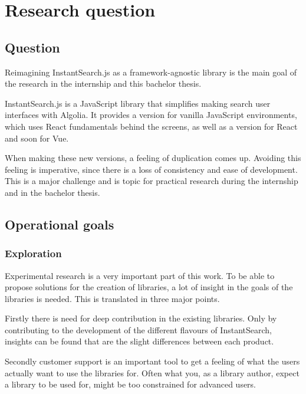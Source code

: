 
\chapter{Research question} %
\label{chp:research_question}
\section{Question}
\label{sec:question}

Reimagining InstantSearch.js as a framework-agnostic \gls{library} is the main goal of the research in the internship and this bachelor thesis.

InstantSearch.js is a JavaScript \gls{library} that simplifies making search user interfaces with Algolia. It provides a version for vanilla JavaScript environments, which uses React fundamentals behind the screens, as well as a version for React and soon for Vue.

When making these new versions, a feeling of duplication comes up. Avoiding this feeling is imperative, since there is a loss of consistency and ease of development. This is a major challenge and is topic for practical research during the internship and in the bachelor thesis.

\section{Operational goals}
\label{sec:operational_goals}

\subsection{Exploration}

Experimental research is a very important part of this work. To be able to propose solutions for the creation of libraries, a lot of insight in the goals of the libraries is needed. This is translated in three major points. 

Firstly there is need for deep contribution in the existing libraries. Only by contributing to the development of the different flavours of InstantSearch, insights can be found that are the slight differences between each product.

Secondly customer support is an important tool to get a feeling of what the users actually want to use the libraries for. Often what you, as a \gls{library} author, expect a \gls{library} to be used for, might be too constrained for advanced users.


